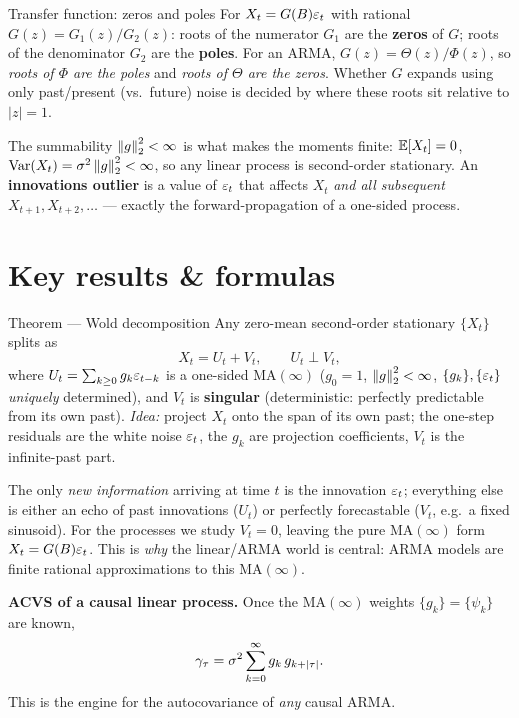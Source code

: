 \documentclass[11pt]{article}
\begin{document}
\begin{defn}{Transfer function: zeros and poles}
For $X_t=G(B)\varepsilon_t$ with rational $G(z)=G_1(z)/G_2(z)$: roots of the numerator $G_1$ are the \textbf{zeros} of $G$; roots of the denominator $G_2$ are the \textbf{poles}. For an ARMA, $G(z)=\Theta(z)/\Phi(z)$, so \emph{roots of $\Phi$ are the poles} and \emph{roots of $\Theta$ are the zeros}. Whether $G$ expands using only past/present (vs.\ future) noise is decided by where these roots sit relative to $|z|=1$.
\end{defn}

The summability $\left\lVert g \right\rVert_2^2<\infty$ is what makes the moments finite: $\mathbb{E}[X_t]=0$, $\operatorname{Var}(X_t)=\sigma^2\left\lVert g \right\rVert_2^2<\infty$, so any linear process is second-order stationary. An \textbf{innovations outlier} is a value of $\varepsilon_t$ that affects $X_t$ \emph{and all subsequent} $X_{t+1},X_{t+2},\dots$ --- exactly the forward-propagation of a one-sided process.

\section*{Key results \& formulas}

\begin{result}{Theorem --- Wold decomposition}
Any zero-mean second-order stationary $\{X_t\}$ splits as
\[
X_t=U_t+V_t,\qquad U_t\perp V_t,
\]
where $U_t=\sum_{k\ge0}g_k\varepsilon_{t-k}$ is a one-sided $\mathrm{MA}(\infty)$ ($g_0=1$, $\left\lVert g \right\rVert_2^2<\infty$, $\{g_k\},\{\varepsilon_t\}$ \emph{uniquely} determined), and $V_t$ is \textbf{singular} (deterministic: perfectly predictable from its own past).
\emph{Idea:} project $X_t$ onto the span of its own past; the one-step residuals are the white noise $\varepsilon_t$, the $g_k$ are projection coefficients, $V_t$ is the infinite-past part.
\end{result}

\begin{intu}
The only \emph{new information} arriving at time $t$ is the innovation $\varepsilon_t$; everything else is either an echo of past innovations ($U_t$) or perfectly forecastable ($V_t$, e.g.\ a fixed sinusoid). For the processes we study $V_t=0$, leaving the pure $\mathrm{MA}(\infty)$ form $X_t=G(B)\varepsilon_t$. This is \emph{why} the linear/ARMA world is central: ARMA models are finite rational approximations to this $\mathrm{MA}(\infty)$.
\end{intu}

\textbf{ACVS of a causal linear process.} Once the $\mathrm{MA}(\infty)$ weights $\{g_k\}=\{\psi_k\}$ are known,
\[
\gamma_\tau=\sigma^2\sum_{k=0}^{\infty}g_k\,g_{k+\left\lvert \tau \right\rvert}.
\]
This is the engine for the autocovariance of \emph{any} causal ARMA.
\end{document}
